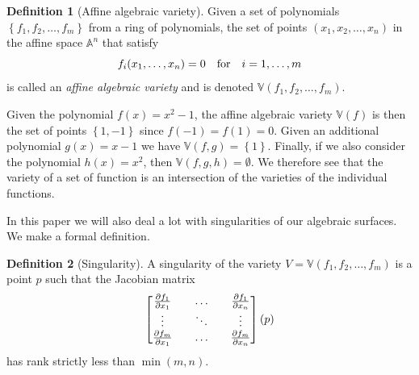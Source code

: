 \documentclass{article}
\theoremstyle{definition}
\newtheorem{definition}{Definition}
\newcommand{\A}{\mathbb{A}}
\newcommand{\V}{\mathbb{V}}
\begin{document}
\begin{definition}[Affine algebraic variety]
    Given a set of polynomials $\left\{ f_1, f_2, \ldots, f_m \right\}$ from a ring
    of polynomials, the set of points $(x_1, x_2, \ldots, x_n)$ in the affine space
    $\A^n$ that satisfy
    \begin{equation}
        \notag
        f_i(x_1, \ldots, x_n) = 0 \quad \text{for} \quad i = 1, \ldots, m
    \end{equation}
    is called an \emph{affine algebraic variety} and is denoted $\V(f_1, f_2,
    \ldots, f_m)$.
\end{definition}

Given the polynomial $f(x) = x^2 - 1$, the affine algebraic variety $\V(f)$ is
then the set of points $\left\{ 1, -1 \right\}$ since $f(-1) = f(1) = 0$.
Given an additional polynomial $g(x) = x-1$ we have $\V(f, g) = \left\{ 1
\right\}$. Finally, if we also consider the polynomial $h(x) = x^2$, then
$\V(f, g, h) = \emptyset$. We therefore see that the variety of a set of
function is an intersection of the varieties of the individual functions.

In this paper we will also deal a lot with singularities of our algebraic
surfaces. We make a formal definition.
\begin{definition}[Singularity]
    A singularity of the variety $V = \V(f_1, f_2, \ldots, f_m)$ is a point $p$ such
    that the Jacobian matrix
    \begin{equation}
        \notag
        \begin{bmatrix}
            \frac{\partial f_1}{\partial x_1} && \hdots && \frac{\partial f_1}{\partial x_n} \\
            \vdots && \ddots && \vdots \\
            \frac{\partial f_m}{\partial x_1} && \hdots && \frac{\partial f_m}{\partial x_n}
        \end{bmatrix}(p)
    \end{equation} has rank strictly less than $\min(m, n)$.
\end{definition}
\end{document}
